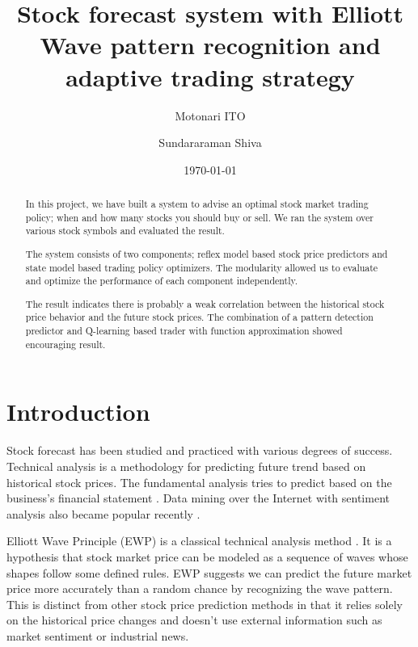 \documentclass[twocolumn,10pt]{asme2ej}
\begin{document}
\title{Stock forecast system with Elliott Wave pattern recognition and adaptive trading strategy}
\author{Motonari ITO
}

\author{Sundararaman Shiva
}

\author{\today}

\maketitle

\begin{abstract}
  In this project, we have built a system to advise an optimal stock market
  trading policy; when and how many stocks you should buy or sell. We ran the
  system over various stock symbols and evaluated the result.

  The system consists of two components; reflex model based stock price
  predictors and state model based trading policy optimizers. The
  modularity allowed us to evaluate and optimize the performance of each
  component independently.
  
  The result indicates there is probably a weak correlation between
  the historical stock price behavior and the future stock prices. The
  combination of a pattern detection predictor and Q-learning based
  trader with function approximation showed encouraging result.
\end{abstract}

\section{Introduction}

Stock forecast has been studied and practiced with various degrees of
success. Technical analysis is a methodology for predicting future
trend based on historical stock
prices\cite{wiki:technical_analysis}. The fundamental analysis tries
to predict based on the business's financial statement
\cite{wiki:fundamental_analysis}. Data mining over the Internet with
sentiment analysis also became popular recently
\cite{web:data_mining_analysis}.

Elliott Wave Principle (EWP) is a classical technical analysis method
\cite{frost1981elliott, web:study_of_cycles}. It is a hypothesis that
stock market price can be modeled as a sequence of waves whose shapes
follow some defined rules. EWP suggests we can predict the future
market price more accurately than a random chance by recognizing the
wave pattern.  This is distinct from other stock price prediction
methods in that it relies solely on the historical price changes and
doesn't use external information such as market sentiment or
industrial news.
\end{document}
